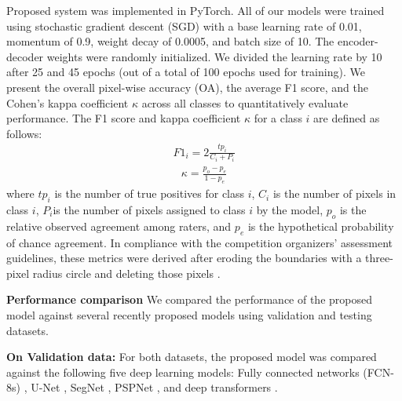 \documentclass[journal]{IEEEtran}
\begin{document}
Proposed system was implemented in PyTorch. All of our models were trained using stochastic gradient descent (SGD) with a base learning rate of 0.01, momentum of 0.9, weight decay of 0.0005, and batch size of 10. The encoder-decoder weights were randomly initialized. We divided the learning rate by 10 after 25 and 45 epochs (out of a total of 100 epochs used for training). 
We present the overall pixel-wise accuracy (OA), the average F1 score, and the Cohen's kappa coefficient $\kappa$ across all classes to quantitatively evaluate performance. The F1 score and kappa coefficient $\kappa$ for a class $i$  are defined as follows:
\begin{equation}
\label{eq:6}
\begin{aligned}
F1_i = 2 \frac{tp_i}{C_i+P_i} 
\end{aligned}
\end{equation}
\begin{equation}
\label{eq:7}
\begin{aligned}
\kappa = \frac{p_o-p_e}{1-p_e} 
\end{aligned}
\end{equation}
where $tp_i$ is the number of true positives for class $i$, $C_i$ is the number of pixels in class $i$, $P_i$is the number of pixels assigned to class $i$ by the model, $p_o$ is the relative observed agreement among raters, and $p_e$ is the hypothetical probability of chance agreement. In compliance with the competition organizers' assessment guidelines, these metrics were derived after eroding the boundaries with a three-pixel radius circle and deleting those pixels \cite{AUDEBERT201820}.

\textbf{Performance comparison}
We compared the performance of the proposed model against several recently proposed models using validation and testing datasets. 

\textbf{On Validation data:} For both datasets, the proposed model was compared against the following five deep learning models: Fully connected networks (FCN-8s) \cite{Long_2015_CVPR}, U-Net \cite{8309343}, SegNet \cite{7803544}, PSPNet \cite{8100143}, and deep transformers \cite{9491802}.  
\end{document}
